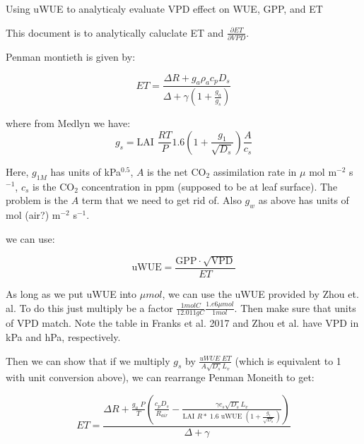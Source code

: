 
\usepackage{graphics, graphicx}
\graphicspath{ {./} } %


\begin{center}
\large{Using uWUE to analyticaly evaluate VPD effect on WUE, GPP, and ET}\end{center}

\bigskip

This document is to analytically caluclate ET and $\frac{\partial ET} {\partial VPD}$.

Penman montieth is given by:

\begin{equation}
  ET = \frac{\Delta R + g_a \rho_a c_p D_{s}}{\Delta + \gamma(1 + \frac{g_a}{g_s})}
\end{equation}

where from Medlyn we have:
\begin{equation}
  g_s = \text{LAI } \frac{R T}{P} 1.6 \left(1 + \frac{g_1}{\sqrt{D_{s}}}\right) \frac{A}{c_s}
\end{equation}

Here, $g_{1M}$ has units of kPa$^{0.5}$, $A$ is the net CO$_2$ assimilation rate in $\mu$ mol m$^{-2}$ s$^{-1}$, $c_s$ is the CO$_2$ concentration in ppm (supposed to be at leaf surface). The problem is the $A$ term that we need to get rid of. Also $g_w$ as above has units of mol (air?) m$^{-2}$ s$^{-1}$. 

we can use:

\begin{equation}
  \text{uWUE} = \frac{\text{GPP} \cdot \sqrt{\text{VPD}}}{ET}
\end{equation}

As long as we put uWUE into $\mu mol$, we can use the uWUE provided by Zhou et. al. To do this just multiply be a factor $ \frac{1 mol C}{12.011 g C} \frac{1.e6 \mu mol}{1 mol}$. Then make sure that units of VPD match. Note the table in Franks et al. 2017 and Zhou et al. have VPD in kPa and hPa, respectively.

Then we can show that if we multiply $g_s$ by $\frac{ uWUE \; ET}{A \sqrt{D_s} L_v}$ (which is equivalent to 1 with unit conversion above), we can rearrange Penman Moneith to get:

\begin{equation}
  ET = \frac{\Delta R + \frac{g_a\; P}{T} \left( \frac{ c_p D_{s}}{R_{air}} - \frac{\gamma c_s \sqrt{D_s} L_v }{\text{LAI } R* \; 1.6 \text{ uWUE } (1 + \frac{g_1}{\sqrt{D_s}})} \right) }{ \Delta + \gamma}
\end{equation}

